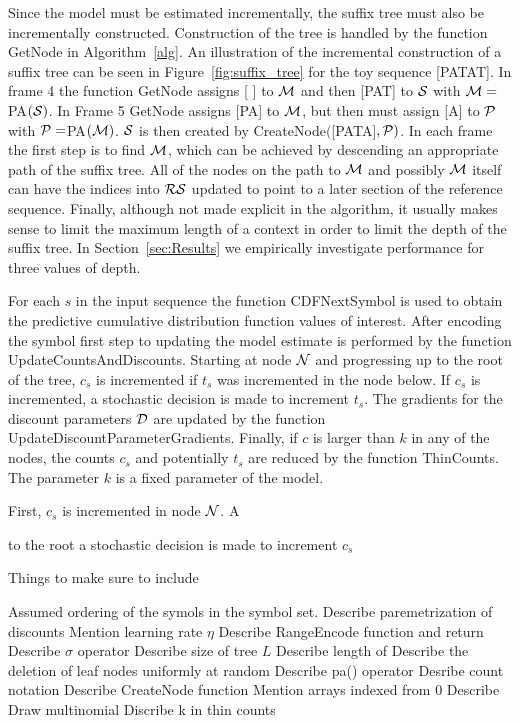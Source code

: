 Since the model must be estimated incrementally, the suffix tree must also be incrementally constructed.  Construction of the tree is handled by the function GetNode in Algorithm~\ref{alg}.  An illustration of the incremental construction of a suffix tree can be seen in Figure~\ref{fig:suffix_tree} for the toy sequence [PATAT].   In frame 4 the function GetNode assigns [ ]  to $\M$ and then [PAT] to $\Seq$ with $\M = $ PA$(\Seq)$. In Frame 5 GetNode assigns [PA] to $\M$, but then must assign [A] to $\PP$ with $\PP = $PA$(\M)$.  $\Seq$ is then created by CreateNode$($[PATA]$,\PP)$.  In each frame the first step is to find $\M$, which can be achieved by descending an appropriate path of the suffix tree.  All of the nodes on the path to $\M$ and possibly $\M$ itself can have the indices into $\RS$ updated to point to a later section of the reference sequence.  Finally, although not made explicit in the algorithm, it usually makes sense to limit the maximum length of a context in order to limit the depth of the suffix tree.  In Section~\ref{sec:Results} we empirically investigate performance for three values of depth.

For each $s$ in the input sequence the function CDFNextSymbol is used to obtain the predictive cumulative distribution function values of interest.  After encoding the symbol first step to updating the model estimate is performed by the function UpdateCountsAndDiscounts.  Starting at node $\N$ and progressing up to the root of the tree, $c_s$ is incremented if $t_s$ was incremented in the node below.  If $c_s$ is incremented, a stochastic decision is made to increment $t_s$.  The gradients for the discount parameters $\D$ are updated by the function UpdateDiscountParameterGradients.  Finally, if $c$ is larger than $k$ in any of the nodes, the counts $c_s$ and potentially $t_s$ are reduced by the function ThinCounts.  The parameter $k$ is a fixed parameter of the model.

First, $c_s$ is incremented in node $\N$.  A

to the root a stochastic decision is made to increment $c_s$ 


Things to make sure to include

Assumed ordering of the symols in the symbol set.
Describe paremetrization of discounts
Mention learning rate $\eta$
Describe RangeEncode function and return
Describe $\sigma$ operator
Describe size of tree $L$
Describe length of \RS \space 
Describe the deletion of leaf nodes uniformly at random
Describe pa(\N) operator
Desribe count notation
Describe CreateNode function
Mention arrays indexed from 0
Describe Draw multinomial
Discribe k in thin counts

